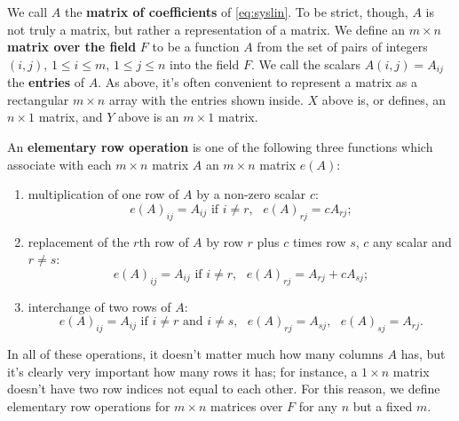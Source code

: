 \documentclass[12pt]{article}
\begin{document}
\begin{defn}
  We call $A$ the \textbf{matrix of coefficients} of
  \eqref{eq:syslin}. To be strict, though, $A$ is not truly a
  matrix, but rather a representation of a matrix. We define an
  $m \times n$ \textbf{matrix over the field} $F$ to be a
  function $A$ from the set of pairs of integers $(i,j)$, $1 \leq
  i \leq m$, $1 \leq j \leq n$ into the field $F$. We call the
  scalars $A(i,j) = A_{ij}$ the \textbf{entries} of $A$. As
  above, it's often convenient to represent a matrix as a
  rectangular $m \times n$ array with the entries shown inside.
  $X$ above is, or defines, an $n \times 1$ matrix, and $Y$ above
  is an $m \times 1$ matrix.
\end{defn}

\begin{defn}
  An \textbf{elementary row operation} is one of the following
  three functions which associate with each $m \times n$ matrix
  $A$ an $m \times n$ matrix $e(A)$:
  \begin{enumerate}
      \item \label{ero1}
        multiplication of one row of $A$ by a non-zero scalar
        $c$:
        \begin{equation*}
          e(A)_{ij} = A_{ij} \text{ if } i \neq r,\text{ }e(A)_{rj} = cA_{rj};
        \end{equation*}
      \item \label{ero2}
        replacement of the $r$th row of $A$ by row $r$ plus $c$
        times row $s$, $c$ any scalar and $r \neq s$:
        \begin{equation*}
          e(A)_{ij} = A_{ij} \text{ if } i \neq r,\text{ }e(A)_{rj} =
          A_{rj} + cA_{sj};
        \end{equation*}
      \item \label{ero3}
        interchange of two rows of $A$:
        \begin{equation*}
          e(A)_{ij} = A_{ij} \text{ if } i \neq r \text{ and } i
          \neq s,\text{ }e(A)_{rj} = A_{sj},\text{ }e(A)_{sj} = A_{rj}.
        \end{equation*}
  \end{enumerate}

  In all of these operations, it doesn't matter much how many
  columns $A$ has, but it's clearly very important how many rows
  it has; for instance, a $1 \times n$ matrix doesn't have two
  row indices not equal to each other. For this reason, we define
  elementary row operations for $m \times n$ matrices over $F$
  for any $n$ but a fixed $m$.
\end{defn}
\end{document}
